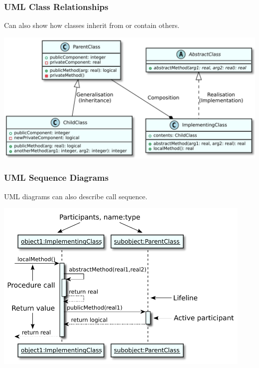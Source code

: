 \documentclass[12pt]{beamer}
\begin{document}
\begin{frame}
  \frametitle{UML Class Relationships}
  Can also show how classes inherit from or contain others.
  
  \vspace{3mm}
  \includegraphics[width=\textwidth]{inheritance_diagram.pdf}
\end{frame}

\begin{frame}
  \frametitle{UML Sequence Diagrams}
  UML diagrams can also describe call sequence.
  
  \begin{center}
    \includegraphics[width=0.93\textwidth]{sequence_diagram.pdf}
  \end{center}

\end{frame}


\end{document}
